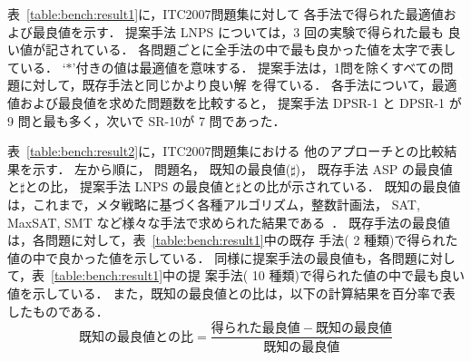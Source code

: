 
表~\ref{table:bench:result1}に，ITC2007問題集に対して
各手法で得られた最適値および最良値を示す．
提案手法 LNPS については，3 回の実験で得られた最も
良い値が記されている．
各問題ごとに全手法の中で最も良かった値を太字で表している．
`$\ast$'付きの値は最適値を意味する．
提案手法は，1問を除くすべての問題に対して，既存手法と同じかより良い解
を得ている．
各手法について，最適値および最良値を求めた問題数を比較すると，
提案手法 \textsf{DPSR-1} と \textsf{DPSR-1} が 9 問と最も多く，次いで
\textsf{SR-10}が 7 問であった．


表~\ref{table:bench:result2}に，ITC2007問題集における
他のアプローチとの比較結果を示す．
左から順に，
問題名，
既知の最良値($\sharp$)，
既存手法 ASP の最良値と$\sharp$との比，
提案手法 LNPS の最良値と$\sharp$との比が示されている．
既知の最良値は，これまで，メタ戦略に基づく各種アルゴリズム，整数計画法，
SAT, MaxSAT, SMT など様々な手法で求められた結果である~\cite{anor/Banbara2019}．
既存手法の最良値は，各問題に対して，表~\ref{table:bench:result1}中の既存
手法( 2 種類)で得られた値の中で良かった値を示している．
同様に提案手法の最良値も，各問題に対して，表~\ref{table:bench:result1}中の提
案手法( 10 種類)で得られた値の中で最も良い値を示している．
また，既知の最良値との比は，以下の計算結果を百分率で表したものである．
\[
既知の最良値との比 = \frac{得られた最良値 - 既知の最良値}{既知の最良値}
\]

